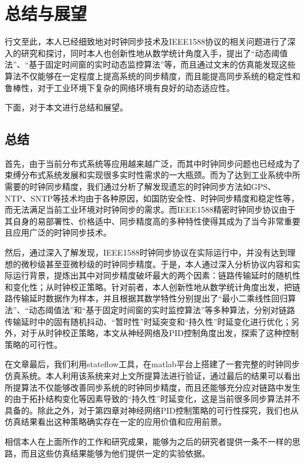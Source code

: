 
\chapter{总结与展望}
行文至此，本人已经细致地对时钟同步技术及IEEE1588协议的相关问题进行了深入的研究和探讨，同时本人也创新性地从数学统计角度入手，提出了“动态阈值法”、“基于固定时间窗的实时动态监控算法”等，而且通过文末的仿真能发现这些算法不仅能够在一定程度上提高系统的同步精度，而且能提高同步系统的稳定性和鲁棒性，对于工业环境下复杂的网络环境有良好的动态适应性。

下面，对于本文进行总结和展望。

\section{总结}
首先，由于当前分布式系统等应用越来越广泛，而其中时钟同步问题也已经成为了束缚分布式系统发展和实现很多实时性需求的一大瓶颈。而为了达到工业系统中所需要的时钟同步精度，我们通过分析了解发现遗忘的时钟同步方法如GPS、NTP、SNTP等技术均由于各种原因，如国防安全性、时钟同步精度和稳定性等，而无法满足当前工业环境对时钟同步的需求。而IEEE1588精密时钟同步协议由于其自身的易部署性、价格适中、同步精度高的多种特性使得其成为了当今非常重要且应用广泛的时钟同步技术。

然后，通过深入了解发现，IEEE1588时钟同步协议在实际运行中，并没有达到理想的微秒级甚至亚微秒级的时钟同步精度。于是，本人通过深入分析协议内容和实际运行背景，提炼出其中对同步精度破坏最大的两个因素：链路传输延时的随机性和变化性；从时钟校正策略。针对前者，本人创新性地从数学统计角度出发，把链路传输延时数据作为样本，并且根据其数学特性分别提出了“最小二乘线性回归算法”、“动态阈值法”和“基于固定时间窗的实时监控算法”等多种算法，分别对链路传输延时中的固有随机抖动、“暂时性”时延突变和“持久性”时延变化进行优化；另外，对于从时钟校正策略，本文从神经网络及PID控制角度出发，探索了这种控制策略的可行性。

在文章最后，我们利用stateflow工具，在matlab平台上搭建了一套完整的时钟同步仿真系统。本人利用该系统来对上文所提算法进行验证，通过最后的结果可以看出所提算法不仅能够改善同步系统的时钟同步精度，而且还能够充分应对链路中发生的由于拓扑结构变化等因素导致的“持久性”时延变化，这是当前很多同步算法并不具备的。除此之外，对于第四章对神经网络PID控制策略的可行性探究，我们也从仿真结果看出这种策略确实存在一定的应用价值和应用前景。

相信本人在上面所作的工作和研究成果，能够为之后的研究者提供一条不一样的思路，而且这些仿真结果能够为他们提供一定的实验依据。 

